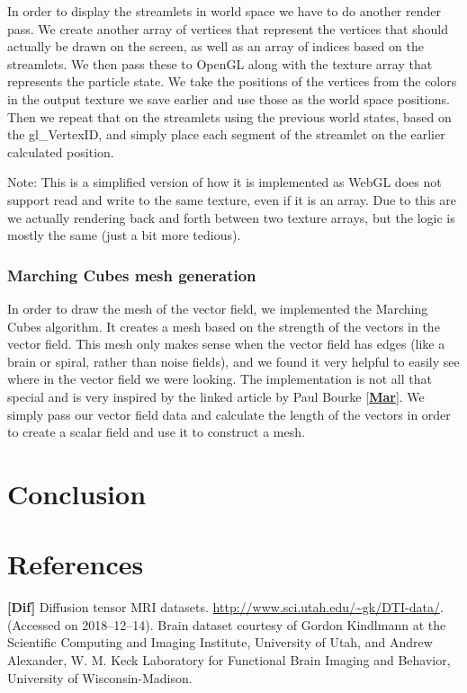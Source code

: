 \documentclass{article}
\newcommand{\reference}[1]{[\hyperref[ref:#1]{\textbf{#1}}]}
\begin{document}
In order to display the streamlets in world space we have to do another render pass. We create another array of vertices that represent the vertices that should actually be drawn on the screen, as well as an array of indices based on the streamlets. We then pass these to OpenGL along with the texture array that represents the particle state. We take the positions of the vertices from the colors in the output texture we save earlier and use those as the world space positions. Then we repeat that on the streamlets using the previous world states, based on the gl\_VertexID, and simply place each segment of the streamlet on the earlier calculated position.

Note: This is a simplified version of how it is implemented as WebGL does not support read and write to the same texture, even if it is an array. Due to this are we actually rendering back and forth between two texture arrays, but the logic is mostly the same (just a bit more tedious).

\subsubsection*{Marching Cubes mesh generation}

In order to draw the mesh of the vector field, we implemented the Marching Cubes algorithm. It creates a mesh based on the strength of the vectors in the vector field. This mesh only makes sense when the vector field has edges (like a brain or spiral, rather than noise fields), and we found it very helpful to easily see where in the vector field we were looking. The implementation is not all that special and is very inspired by the linked article by Paul Bourke \reference{Mar}. We simply pass our vector field data and calculate the length of the vectors in order to create a scalar field and use it to construct a mesh.

\section*{Conclusion}


\section*{References}

\textbf{[Dif]}\label{ref:Dif}
Diffusion tensor MRI datasets. \url{http://www.sci.utah.edu/~gk/DTI-data/}. (Accessed on 2018--12--14). Brain dataset courtesy of Gordon Kindlmann at the Scientific Computing and Imaging Institute, University of Utah, and Andrew Alexander, W. M. Keck Laboratory for Functional Brain Imaging and Behavior, University of Wisconsin-Madison.
\end{document}
